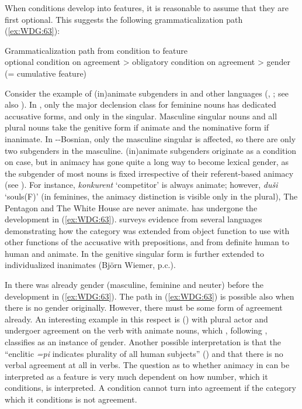 \documentclass[output=collectionpaper]{langsci/langscibook}
\begin{document}
When conditions develop into features, it is reasonable to assume that they are first optional. This suggests the following grammaticalization path (\ref{ex:WDG:63}):

\ea\label{ex:WDG:63}
Grammaticalization path from condition to feature\\
optional condition on agreement > obligatory condition on agreement > gender (= cumulative feature)\\
\z

Consider the example of (in)animate subgenders in  and other  languages (\citealt[42]{Corbett1991}, \citeyear*[118]{Corbett2006}; see also ). In , only the major declension class for feminine nouns has dedicated accusative forms, and only in the singular. Masculine singular nouns and all plural nouns take the genitive form if animate and the nominative form if inanimate. In --Bosnian, only the masculine singular is affected, so there are only two subgenders in the masculine.  (in)animate subgenders originate as a condition on case, but in  animacy has gone quite a long way to become lexical gender, as the subgender of most nouns is fixed irrespective of their referent-based animacy (see ). For instance, \textit{konkurent} `competitor' is always animate; however, \textit{duši} `souls(F)' (in feminines, the animacy distinction is visible only in the plural), The Pentagon and The White House are never animate.  has undergone the development in (\ref{ex:WDG:63}). \cite{Huntley1980} surveys evidence from several  languages demonstrating how the category was extended from object function to use with other functions of the accusative with prepositions, and from definite human to human and animate. In  the genitive singular form is further extended to individualized inanimates (Björn Wiemer, p.c.).

In  there was already gender (masculine, feminine and neuter) before the development in (\ref{ex:WDG:63}). The path in (\ref{ex:WDG:63}) is possible also when there is no gender originally. However, there must be some form of agreement already. An interesting example in this respect is  () with plural actor and undergoer agreement on the verb with animate nouns, which , following \cite[36--37]{Valin1977}, classifies as an instance of gender. Another possible interpretation is that the ``enclitic \textit{=pi} indicates plurality of all human subjects'' (\citealt[508]{Mithun1999}) and that there is no verbal agreement at all in  verbs. The question as to whether animacy in  can be interpreted as a feature is very much dependent on how number, which it conditions, is interpreted. A condition cannot turn into agreement if the category which it conditions is not agreement.
\end{document}
